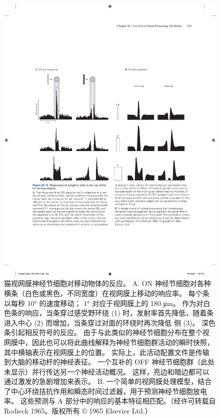 \begin{figure}[htbp]
	\centering
	\includegraphics[width=1.0\linewidth]{chap22/fig_22_11}
	\caption{猫视网膜神经节细胞对移动物体的反应。 
		A. ON 神经节细胞对各种横条（白色或黑色，不同宽度）在视网膜上移动的响应率。 
		每个条以每秒 10° 的速度移动； 1° 对应于视网膜上的 180 μm。 作为对白色条的响应，当条穿过感受野环绕 (1) 时，发射率首先降低，随着条进入中心 (2) 而增加，当条穿过对面的环绕时再次降低 侧 (3)。 深色条引起相反符号的反应。 
		由于与此类似的神经节细胞分布在整个视网膜中，因此也可以将此曲线解释为神经节细胞群活动的瞬时快照，其中横轴表示在视网膜上的位置。 
		实际上，此活动配置文件是传输到大脑的移动杆的神经表征。 
		一个互补的 OFF 神经节细胞群（此处未显示）并行传达另一个神经活动概况。 这样，亮边和暗边都可以通过激发的急剧增加来表示。 
		B. 一个简单的视网膜处理模型，结合了中心环绕拮抗作用和瞬态时间过滤器，用于预测神经节细胞放电率。 
		这些预测与 A 部分中的响应的基本特征相匹配。（经许可转载自 Rodieck 1965。版权所有 © 1965 Elsevier Ltd.）}
	\label{fig:22_11}
\end{figure}


